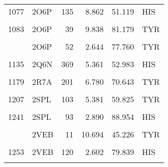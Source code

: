 \begin{table}
\begin{tabular}{llrrrl}
			1077 & 2O6P & 135 & 8.862 & 51.119 & HIS\\
			\cellcolor{gray!6}{1078} & \cellcolor{gray!6}{2O6P} & \cellcolor{gray!6}{136} & \cellcolor{gray!6}{3.338} & \cellcolor{gray!6}{86.464} & \cellcolor{gray!6}{TYR}\\
			1083 & 2O6P & 39 & 9.838 & 81.179 & TYR\\
			\cellcolor{gray!6}{1085} & \cellcolor{gray!6}{2O6P} & \cellcolor{gray!6}{41} & \cellcolor{gray!6}{8.850} & \cellcolor{gray!6}{82.547} & \cellcolor{gray!6}{TYR}\\
			\addlinespace
			1094 & 2O6P & 52 & 2.644 & 77.760 & TYR\\
			\cellcolor{gray!6}{1098} & \cellcolor{gray!6}{2O6P} & \cellcolor{gray!6}{74} & \cellcolor{gray!6}{6.398} & \cellcolor{gray!6}{86.342} & \cellcolor{gray!6}{HIS}\\
			1135 & 2Q6N & 369 & 5.361 & 52.983 & HIS\\
			\cellcolor{gray!6}{1146} & \cellcolor{gray!6}{2Q6N} & \cellcolor{gray!6}{436} & \cellcolor{gray!6}{1.918} & \cellcolor{gray!6}{40.993} & \cellcolor{gray!6}{CYS}\\
			1179 & 2R7A & 201 & 6.780 & 70.643 & TYR\\
			\addlinespace
			\cellcolor{gray!6}{1200} & \cellcolor{gray!6}{2R7A} & \cellcolor{gray!6}{67} & \cellcolor{gray!6}{2.239} & \cellcolor{gray!6}{73.259} & \cellcolor{gray!6}{TYR}\\
			1207 & 2SPL & 103 & 5.381 & 59.825 & TYR\\
			\cellcolor{gray!6}{1227} & \cellcolor{gray!6}{2SPL} & \cellcolor{gray!6}{64} & \cellcolor{gray!6}{4.293} & \cellcolor{gray!6}{73.719} & \cellcolor{gray!6}{HIS}\\
			1241 & 2SPL & 93 & 2.890 & 88.954 & HIS\\
			\cellcolor{gray!6}{1243} & \cellcolor{gray!6}{2SPL} & \cellcolor{gray!6}{97} & \cellcolor{gray!6}{3.454} & \cellcolor{gray!6}{67.846} & \cellcolor{gray!6}{HIS}\\
			\addlinespace
			1247 & 2VEB & 11 & 10.694 & 45.226 & TYR\\
			\cellcolor{gray!6}{1248} & \cellcolor{gray!6}{2VEB} & \cellcolor{gray!6}{112} & \cellcolor{gray!6}{5.772} & \cellcolor{gray!6}{72.895} & \cellcolor{gray!6}{TYR}\\
			1253 & 2VEB & 120 & 2.602 & 79.839 & HIS\\
			\cellcolor{gray!6}{1254} & \cellcolor{gray!6}{2VEB} & \cellcolor{gray!6}{121} & \cellcolor{gray!6}{8.762} & \cellcolor{gray!6}{74.095} & \cellcolor{gray!6}{HIS}\\

\end{tabular}
\end{table}
